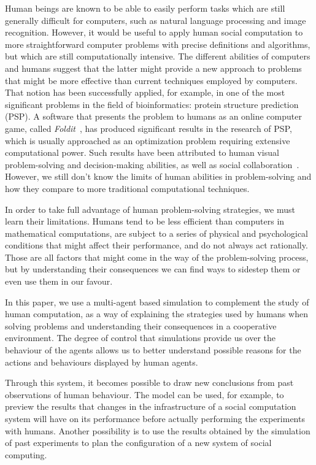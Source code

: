 \documentclass{article}
\begin{document}
Human beings are known to be able to easily perform tasks which are still generally difficult for computers, such as natural language processing and image recognition.
However, it would be useful to apply human social computation to more straightforward computer problems with precise definitions and algorithms, but which are still computationally intensive.
The different abilities of computers and humans suggest that the latter might provide a new approach to problems that might be more effective than current techniques employed by computers. That notion has been successfully applied, for example, in one of the most significant problems in the field of bioinformatics: protein structure prediction (PSP). A software that presents the problem to humans as an online computer game, called \emph{Foldit}~\cite{cooper:foldit}, has produced significant results in the research of PSP, which is usually approached as an optimization problem requiring extensive computational power. Such results have been attributed to human visual problem-solving and decision-making abilities, as well as social collaboration~\cite{cooper:foldit}. However, we still don't know the limits of human abilities in problem-solving and how they compare to more traditional computational techniques.

In order to take full advantage of human problem-solving strategies, we must learn their limitations. Humans tend to be less efficient than computers in mathematical computations, are subject to a series of physical and psychological conditions that might affect their performance, and do not always act rationally. Those are all factors that might come in the way of the problem-solving process, but by understanding their consequences we can find ways to sidestep them or even use them in our favour.

In this paper, we use a multi-agent based simulation to complement %
the study of human computation, as a way of explaining the strategies used by humans when solving problems and understanding their consequences in a cooperative environment. The degree of control that simulations provide us over the behaviour of the agents allows us to better understand possible reasons for the actions and behaviours displayed by human agents.

Through this system, it becomes possible to draw new conclusions from past observations of human behaviour. The model can be used, for example, to preview the results that changes in the infrastructure of a social computation system will have on its performance before actually performing the experiments with humans. Another possibility is to use the results obtained by the simulation of past experiments to plan the configuration of a new system of social computing.
\end{document}
